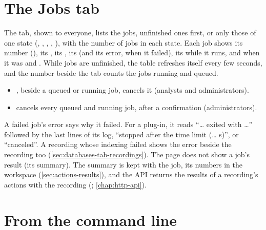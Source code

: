 \section{The Jobs tab}
\label{sec:actions-jobs}

The  tab, shown to everyone, lists the jobs, unfinished ones first, or only those of one
state (, , , , ), with the number of
jobs in each state. Each job shows its number (), its , its , its
 (and its error, when it failed), its  while it runs, and when it was
 and . While
jobs are unfinished, the table refreshes itself every few seconds, and the number beside the
tab counts the jobs running and queued.

\begin{itemize}
\item {}, beside a queued or running job, cancels it (analysts and administrators).
\item {} cancels every queued and running job, after a confirmation
  (administrators).
\end{itemize}

A failed job's error says why it failed. For a plug-in, it reads ``\dots{} exited with \dots''
followed by the last lines of its log, ``stopped after the time limit (\dots{} s)'', or
``canceled''. A recording whose indexing failed shows the error beside the recording too
(\cref{sec:databases-tab-recordings}). The page does not show a job's result (its summary). The
summary is kept with the job, its numbers in the workspace (\cref{sec:actions-results}), and the
API returns the results of a recording's actions with the recording (; \cref{chap:http-api}).

\section{From the command line}
\label{sec:actions-cli}

